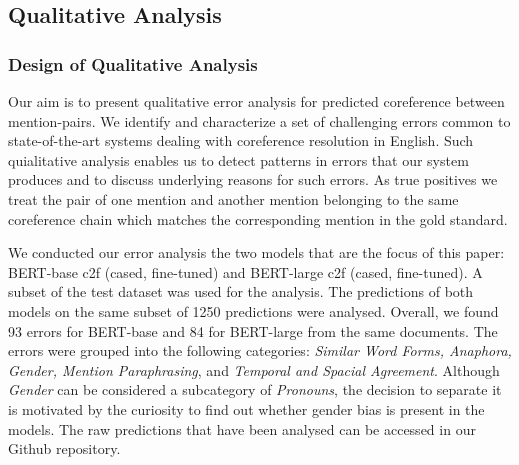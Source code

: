 \documentclass[11pt]{article}
\begin{document}
\subsection{Qualitative Analysis}


\subsubsection{Design of Qualitative Analysis}



Our aim is to present qualitative error analysis for predicted coreference between mention-pairs. We identify and characterize a set of challenging errors common to state-of-the-art systems dealing with coreference resolution in English. Such quialitative analysis enables us to detect patterns in errors that our system produces and to discuss underlying reasons for such errors. As true positives we treat the pair of one mention and another mention belonging to the same coreference chain which matches the corresponding mention in the gold standard. 

We conducted our error analysis the two models that are the focus of this paper: BERT-base c2f (cased, fine-tuned) and BERT-large c2f (cased, fine-tuned). A subset of the test dataset was used for the analysis. The predictions of both models on the same subset of 1250 predictions were analysed. Overall, we found 93 errors for BERT-base and 84 for BERT-large from the same documents. The errors were grouped into the following categories: \textit{Similar Word Forms, Anaphora, Gender, Mention Paraphrasing}, and \textit{Temporal and Spacial Agreement}. Although \textit{Gender} can be considered a subcategory of \textit{Pronouns}, the decision to separate it is motivated by the curiosity to find out whether gender bias is present in the models.
The raw predictions that have been analysed can be accessed in our Github repository. 
\end{document}
